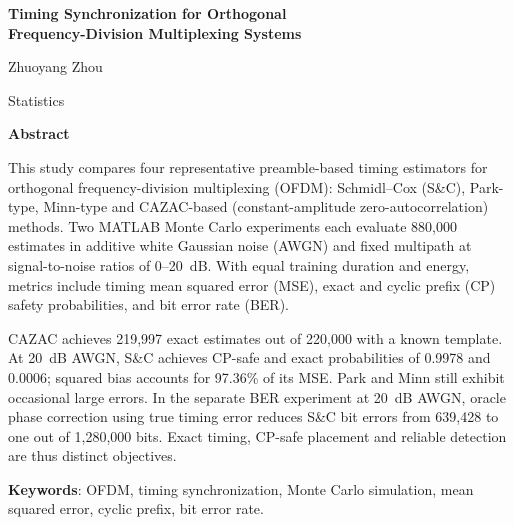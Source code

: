 \begin{center}
{\Large\sffamily\bfseries Timing Synchronization for Orthogonal\\
Frequency-Division Multiplexing Systems\par}
\vspace{2mm}
{\large Zhuoyang Zhou\par}
\vspace{2mm}
{\large Statistics\par}
\vspace{2mm}
{\Large\bfseries Abstract\par}
\end{center}

This study compares four representative preamble-based timing estimators for orthogonal frequency-division multiplexing (OFDM): Schmidl--Cox (S\&C), Park-type, Minn-type and CAZAC-based (constant-amplitude zero-autocorrelation) methods. Two MATLAB Monte Carlo experiments each evaluate 880,000 estimates in additive white Gaussian noise (AWGN) and fixed multipath at signal-to-noise ratios of 0--20~dB. With equal training duration and energy, metrics include timing mean squared error (MSE), exact and cyclic prefix (CP) safety probabilities, and bit error rate (BER).

CAZAC achieves 219,997 exact estimates out of 220,000 with a known template. At 20~dB AWGN, S\&C achieves CP-safe and exact probabilities of 0.9978 and 0.0006; squared bias accounts for 97.36\% of its MSE. Park and Minn still exhibit occasional large errors. In the separate BER experiment at 20~dB AWGN, oracle phase correction using true timing error reduces S\&C bit errors from 639,428 to one out of 1,280,000 bits. Exact timing, CP-safe placement and reliable detection are thus distinct objectives.

\vspace{2mm}
\noindent\textbf{Keywords}: OFDM, timing synchronization, Monte Carlo simulation, mean squared error, cyclic prefix, bit error rate.
